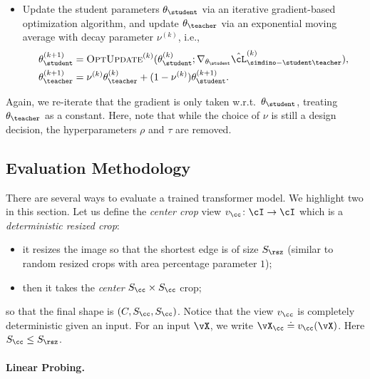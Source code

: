 \documentclass[../../book-main.tex]{subfiles}
\begin{document}
\begin{itemize}
    The
    gradient of \(\hat{\cL}_{\simdino-\student\teacher}^{(k)}\) with
    respect to \(\theta_{\student}\) should (again) be computed,
    under the assumption that \(\theta_{\teacher}\) is constant.
\item Update the student parameters \(\theta_{\student}\) via an
    iterative gradient-based optimization algorithm, and update
    \(\theta_{\teacher}\) via an exponential moving average with
    decay parameter \(\nu^{(k)}\), i.e.,
    \begin{align}
        \theta_{\student}^{(k + 1)}
        &= \textsc{OptUpdate}^{(k)}(\theta_{\student}^{(k)};
        \nabla_{\theta_{\student}}\hat{\cL}_{\simdino-\student\teacher}^{(k)}) ,
        \\
        \theta_{\teacher}^{(k + 1)}
        &= \nu^{(k)}\theta_{\teacher}^{(k)} + (1 -
        \nu^{(k)})\theta_{\student}^{(k + 1)} .
    \end{align}
\end{itemize}
Again, we re-iterate that the gradient is only taken
w.r.t.~\(\theta_{\student}\), treating \(\theta_{\teacher}\) as a
constant.
Here, note that while the choice of \(\nu\) is still a
design decision, the hyperparameters \(\rho\) and \(\tau\) are removed.

\subsection{Evaluation Methodology}\label{sub:contrastive_learning_evals}
There are several ways to evaluate a trained transformer model. We
highlight two in this section.
Let us define the \textit{center crop}
view \(v_{\cc} \colon \cI \to \cI\) which is a \textit{deterministic
resized crop}:
\begin{itemize}
\item it resizes the image so that the shortest edge is of size
    \(S_{\rsz}\) (similar to random resized crops with area
    percentage parameter \(1\));
\item then it takes the \textit{center} \(S_{\cc} \times S_{\cc}\) crop;
\end{itemize}
so that the final shape is \((C, S_{\cc}, S_{\cc})\).
Notice that the
view \(v_{\cc}\) is completely deterministic given an input. For an
input \(\vX\), we write \(\vX_{\cc} \doteq v_{\cc}(\vX)\).
Here
\(S_{\cc} \leq S_{\rsz}\).

\paragraph{Linear Probing.}
\end{document}
